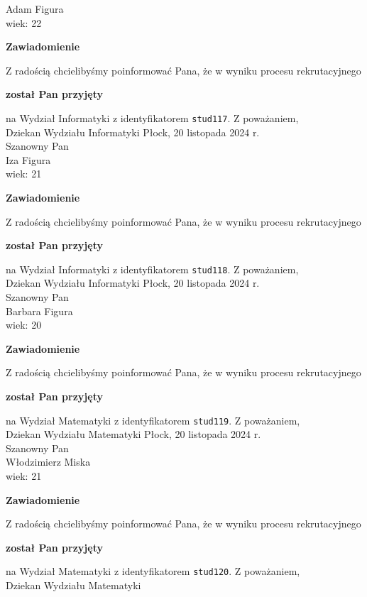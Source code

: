 \documentclass[12pt,a4paper]{article}
\begin{document}
Adam Figura \\
wiek: 22
\bigskip
\begin{center}
 	{\Large\textbf{Zawiadomienie}}
\end{center}
\bigskip
Z radością chcielibyśmy poinformować Pana, że w wyniku procesu rekrutacyjnego 
\begin{center}
\textsf{\textbf{został Pan przyjęty}} 
\end{center}
na Wydział Informatyki z identyfikatorem \verb|stud117|. 
\vspace{2cm}
\noindent
Z poważaniem,\\
Dziekan
Wydziału Informatyki
\newpage
\hfill Płock, 20 listopada 2024 r.\\
\noindent 
Szanowny Pan \\
Iza Figura \\
wiek: 21
\bigskip
\begin{center}
 	{\Large\textbf{Zawiadomienie}}
\end{center}
\bigskip
Z radością chcielibyśmy poinformować Pana, że w wyniku procesu rekrutacyjnego 
\begin{center}
\textsf{\textbf{został Pan przyjęty}} 
\end{center}
na Wydział Informatyki z identyfikatorem \verb|stud118|. 
\vspace{2cm}
\noindent
Z poważaniem,\\
Dziekan
Wydziału Informatyki
\newpage
\hfill Płock, 20 listopada 2024 r.\\
\noindent 
Szanowny Pan \\
Barbara Figura \\
wiek: 20
\bigskip
\begin{center}
 	{\Large\textbf{Zawiadomienie}}
\end{center}
\bigskip
Z radością chcielibyśmy poinformować Pana, że w wyniku procesu rekrutacyjnego 
\begin{center}
\textsf{\textbf{został Pan przyjęty}} 
\end{center}
na Wydział Matematyki z identyfikatorem \verb|stud119|. 
\vspace{2cm}
\noindent
Z poważaniem,\\
Dziekan
Wydziału Matematyki
\newpage
\hfill Płock, 20 listopada 2024 r.\\
\noindent 
Szanowny Pan \\
Włodzimierz Miska \\
wiek: 21
\bigskip
\begin{center}
 	{\Large\textbf{Zawiadomienie}}
\end{center}
\bigskip
Z radością chcielibyśmy poinformować Pana, że w wyniku procesu rekrutacyjnego 
\begin{center}
\textsf{\textbf{został Pan przyjęty}} 
\end{center}
na Wydział Matematyki z identyfikatorem \verb|stud120|. 
\vspace{2cm}
\noindent
Z poważaniem,\\
Dziekan
Wydziału Matematyki
\newpage
\end{document}

